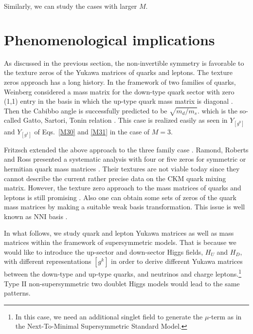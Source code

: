 \documentclass[a4paper,11pt]{article}
\numberwithin{equation}{section}
\begin{document}
Similarly, we can study the cases with larger $M$.





\section{Phenomenological implications}
\label{sec:phenomenology}
As discussed in the previous section,
the non-invertible symmetry is favorable to the texture zeros of
the Yukawa matrices of quarks and leptons.
The texture zeros approach has a long history.
In the framework of two families of quarks, Weinberg considered a mass matrix for the down-type quark 
sector with zero  (1,1) entry in the basis in which the 
up-type quark mass matrix is diagonal \cite{Weinberg:1977hb}.  
Then the Cabibbo angle is successfully predicted to be $\sqrt{m_d/m_s}$.
which is the so-called Gatto, Sartori, Tonin relation \cite{Gatto:1968ss}. 
This case is realized easily as seen in
$Y_{[g^0]}$ and $Y_{[g^1]}$  of Eqs.~\eqref{M30} and \eqref{M31}
 in the case of $M=3$.

Fritzsch extended the above approach to the three
family case \cite{Fritzsch:1977vd,Fritzsch:1979zq}. 
Ramond, Roberts and Ross presented 
a systematic analysis with  four or five zeros
for symmetric or hermitian quark mass matrices \cite{Ramond:1993kv}.
Their textures are not viable today since they cannot describe 
the current rather precise data on the CKM quark mixing 
matrix. However, the texture zero approach to the  mass matrices 
of quarks and leptons
is still promising \cite{Fritzsch:2002ga,Xing:2015sva,Frampton:2002yf,
Kageyama:2002zw}.
Also one can obtain 
some  sets of zeros of the quark mass matrices
by making a suitable weak basis transformation. 
This issue is 
well known as NNI  basis \cite{Branco:1988iq,Branco:1994jx,Branco:1999nb}.


In what follows, we study quark and lepton Yukawa matrices as well as mass matrices within the framework of supersymmetric models. That is because we would like to introduce the up-sector and down-sector Higgs fields, $H_U$ and $H_D$, with different representations $[g^k]$ in order to derive different Yukawa matrices between the down-type and up-type quarks, and neutrinos and charge leptons.\footnote{In this case, we need an additional singlet field to generate the $\mu$-term as in the Next-To-Minimal Supersymmetric Standard Model.}
Type II non-supersymmetric two doublet Higgs models would lead to the same patterns. 
\end{document}
